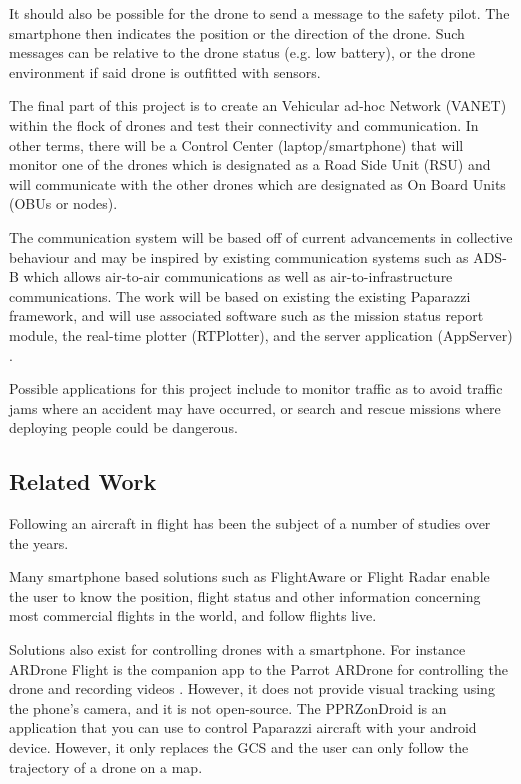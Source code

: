 \documentclass[conference]{IEEEtran}
\begin{document}
It should also be possible for the drone to send a message to the safety pilot. The smartphone then indicates the position or the direction of the drone. Such messages can be relative to the drone status (e.g. low battery), or the drone environment if said drone is outfitted with sensors. 

The final part of this project is to create an Vehicular ad-hoc Network (VANET) within the flock of drones and test their connectivity and communication. In other terms, there will be a Control Center (laptop/smartphone) that will monitor one of the drones which is designated as a Road Side Unit (RSU) and will communicate with the other drones which are designated as On Board Units (OBUs or nodes). 

The communication system will be based off of current advancements in collective behaviour and may be inspired by existing communication systems such as ADS-B \cite{faaAdsbServices, faaAdsbArchitecture} which allows air-to-air communications as well as air-to-infrastructure communications. 
The work will be based on existing the existing Paparazzi framework, and will use associated software such as the mission status report module, the real-time plotter (RTPlotter), and the server application (AppServer) \cite{Paparazzi}.

Possible applications for this project include to monitor traffic as to avoid traffic jams where an accident may have occurred, or search and rescue missions where deploying people could be dangerous. 


\subsection{Related Work}
Following an aircraft in flight has been the subject of a number of studies over the years. 

Many smartphone based solutions such as FlightAware \cite{FlightAware} or Flight Radar \cite{FlightRadar24} enable the user to know the position, flight status and other information concerning most commercial flights in the world, and follow flights live. 

Solutions also exist for controlling drones with a smartphone. For instance ARDrone Flight is the companion app to the Parrot ARDrone for controlling the drone and recording videos \cite{ARDroneFlight,ARDrone}. However, it does not provide visual tracking using the phone's camera, and it is not open-source. The PPRZonDroid \cite{PPRZonDroid} is an application that you can use to control Paparazzi aircraft with your android device. However, it only replaces the GCS and the user can only follow the trajectory of a drone on a map. 
\end{document}
